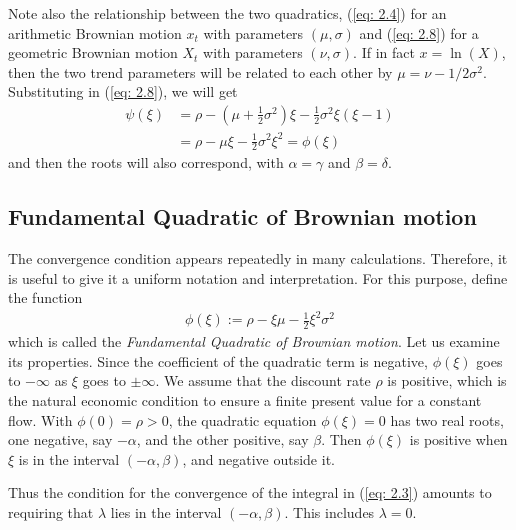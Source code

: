 \documentclass[\topdir/lecture\_notes.tex]{subfiles}
\begin{document}
Note also the relationship between the two quadratics, (\ref{eq: 2.4}) for an arithmetic Brownian motion $x_{t}$ with parameters $(\mu, \sigma)$ and (\ref{eq: 2.8}) for a geometric Brownian motion $X_{t}$ with parameters $(\nu, \sigma)$. If in fact $x=\ln (X)$, then the two trend parameters will be related to each other by $\mu=\nu-1 / 2 \sigma^{2}$. Substituting in (\ref{eq: 2.8}), we will get
\begin{align*}
\psi(\xi) & =\rho-\left(\mu+\frac{1}{2} \sigma^{2}\right) \xi-\frac{1}{2} \sigma^{2} \xi(\xi-1) \\
& =\rho-\mu \xi-\frac{1}{2} \sigma^{2} \xi^{2}=\phi(\xi)
\end{align*}
and then the roots will also correspond, with $\alpha=\gamma$ and $\beta=\delta$.

\begin{optional}
\subsection{Fundamental Quadratic of Brownian motion}
The convergence condition appears repeatedly in many calculations. Therefore, it is useful to give it a uniform notation and interpretation. For this purpose, define the function
\begin{align}
\phi(\xi) := \rho-\xi \mu-\frac{1}{2} \xi^{2} \sigma^{2} \label{eq: 2.4}
\end{align}
which is called the \emph{Fundamental Quadratic of Brownian motion}. Let us examine its properties. Since the coefficient of the quadratic term is negative, $\phi(\xi)$ goes to $-\infty$ as $\xi$ goes to $\pm \infty$. We assume that the discount rate $\rho$ is positive, which is the natural economic condition to ensure a finite present value for a constant flow. With $\phi(0)=\rho>0$, the quadratic equation $\phi(\xi)=0$ has two real roots, one negative, say $-\alpha$, and the other positive, say $\beta$. Then $\phi(\xi)$ is positive when $\xi$ is in the interval $(-\alpha, \beta)$, and negative outside it. 

Thus the condition for the convergence of the integral in (\ref{eq: 2.3}) amounts to requiring that $\lambda$ lies in the interval $(-\alpha, \beta)$. This includes $\lambda=0$.
\end{optional}
\end{document}
